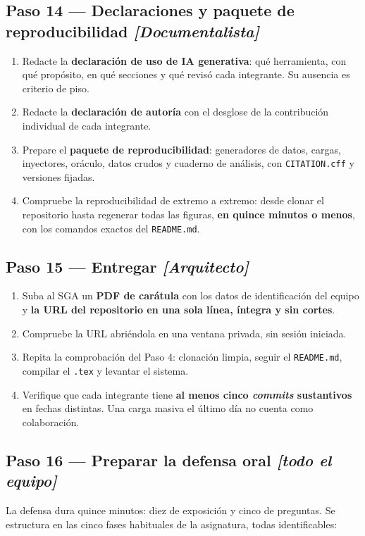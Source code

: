 \documentclass[11pt,a4paper]{article}
\newcommand{\paso}[1]{\subsection{#1}}
\begin{document}
	\paso{Paso 14 --- Declaraciones y paquete de reproducibilidad \emph{[Documentalista]}}
	
	\begin{enumerate}[leftmargin=*,itemsep=4pt]
		\item Redacte la \textbf{declaración de uso de IA generativa}: qué herramienta, con qué propósito, en qué secciones y qué revisó cada integrante. Su ausencia es criterio de piso.
		\item Redacte la \textbf{declaración de autoría} con el desglose de la contribución individual de cada integrante.
		\item Prepare el \textbf{paquete de reproducibilidad}: generadores de datos, cargas, inyectores, oráculo, datos crudos y cuaderno de análisis, con \texttt{CITATION.cff} y versiones fijadas.
		\item Compruebe la reproducibilidad de extremo a extremo: desde clonar el repositorio hasta regenerar todas las figuras, \textbf{en quince minutos o menos}, con los comandos exactos del \texttt{README.md}.
	\end{enumerate}
	
	\paso{Paso 15 --- Entregar \emph{[Arquitecto]}}
	
	\begin{enumerate}[leftmargin=*,itemsep=4pt]
		\item Suba al SGA un \textbf{PDF de carátula} con los datos de identificación del equipo y \textbf{la URL del repositorio en una sola línea, íntegra y sin cortes}.
		\item Compruebe la URL abriéndola en una ventana privada, sin sesión iniciada.
		\item Repita la comprobación del Paso 4: clonación limpia, seguir el \texttt{README.md}, compilar el \texttt{.tex} y levantar el sistema.
		\item Verifique que cada integrante tiene \textbf{al menos cinco \emph{commits} sustantivos} en fechas distintas. Una carga masiva el último día no cuenta como colaboración.
	\end{enumerate}
	
	\paso{Paso 16 --- Preparar la defensa oral \emph{[todo el equipo]}}
	
	La defensa dura quince minutos: diez de exposición y cinco de preguntas. Se estructura en las cinco fases habituales de la asignatura, todas identificables:
	
\end{document}
